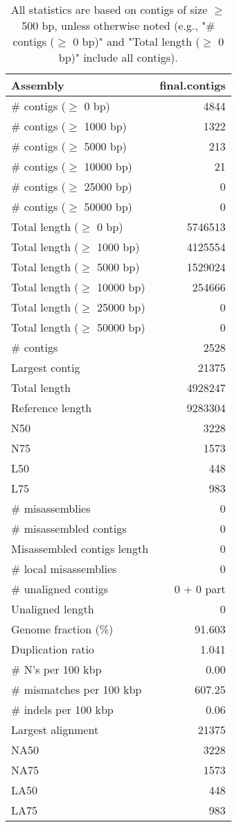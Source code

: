 \documentclass[12pt,a4paper]{article}
\begin{document}
\begin{table}[ht]
\begin{center}
\caption{All statistics are based on contigs of size $\geq$ 500 bp, unless otherwise noted (e.g., "\# contigs ($\geq$ 0 bp)" and "Total length ($\geq$ 0 bp)" include all contigs).}
\begin{tabular}{|l*{1}{|r}|}
\hline
Assembly & final.contigs \\ \hline
\# contigs ($\geq$ 0 bp) & 4844 \\ \hline
\# contigs ($\geq$ 1000 bp) & 1322 \\ \hline
\# contigs ($\geq$ 5000 bp) & 213 \\ \hline
\# contigs ($\geq$ 10000 bp) & 21 \\ \hline
\# contigs ($\geq$ 25000 bp) & 0 \\ \hline
\# contigs ($\geq$ 50000 bp) & 0 \\ \hline
Total length ($\geq$ 0 bp) & 5746513 \\ \hline
Total length ($\geq$ 1000 bp) & 4125554 \\ \hline
Total length ($\geq$ 5000 bp) & 1529024 \\ \hline
Total length ($\geq$ 10000 bp) & 254666 \\ \hline
Total length ($\geq$ 25000 bp) & 0 \\ \hline
Total length ($\geq$ 50000 bp) & 0 \\ \hline
\# contigs & 2528 \\ \hline
Largest contig & 21375 \\ \hline
Total length & 4928247 \\ \hline
Reference length & 9283304 \\ \hline
N50 & 3228 \\ \hline
N75 & 1573 \\ \hline
L50 & 448 \\ \hline
L75 & 983 \\ \hline
\# misassemblies & 0 \\ \hline
\# misassembled contigs & 0 \\ \hline
Misassembled contigs length & 0 \\ \hline
\# local misassemblies & 0 \\ \hline
\# unaligned contigs & 0 + 0 part \\ \hline
Unaligned length & 0 \\ \hline
Genome fraction (\%) & 91.603 \\ \hline
Duplication ratio & 1.041 \\ \hline
\# N's per 100 kbp & 0.00 \\ \hline
\# mismatches per 100 kbp & 607.25 \\ \hline
\# indels per 100 kbp & 0.06 \\ \hline
Largest alignment & 21375 \\ \hline
NA50 & 3228 \\ \hline
NA75 & 1573 \\ \hline
LA50 & 448 \\ \hline
LA75 & 983 \\ \hline
\end{tabular}
\end{center}
\end{table}
\end{document}
